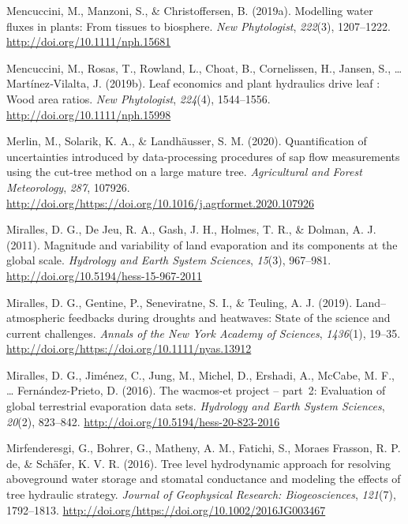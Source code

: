 \documentclass[11pt,twoside]{reedthesis}
\begin{document}
\hypertarget{ref-mencuccinimodelling2019}{}
Mencuccini, M., Manzoni, S., \& Christoffersen, B. (2019a). Modelling
water fluxes in plants: From tissues to biosphere. \emph{New
Phytologist}, \emph{222}(3), 1207--1222.
\url{http://doi.org/10.1111/nph.15681}

\hypertarget{ref-mencuccini_leaf_2019}{}
Mencuccini, M., Rosas, T., Rowland, L., Choat, B., Cornelissen, H.,
Jansen, S., \ldots{} Martínez‐Vilalta, J. (2019b). Leaf economics and
plant hydraulics drive leaf : Wood area ratios. \emph{New Phytologist},
\emph{224}(4), 1544--1556. \url{http://doi.org/10.1111/nph.15998}

\hypertarget{ref-Merlin2020}{}
Merlin, M., Solarik, K. A., \& Landhäusser, S. M. (2020). Quantification
of uncertainties introduced by data-processing procedures of sap flow
measurements using the cut-tree method on a large mature tree.
\emph{Agricultural and Forest Meteorology}, \emph{287}, 107926.
\url{http://doi.org/https://doi.org/10.1016/j.agrformet.2020.107926}

\hypertarget{ref-Miralles2011}{}
Miralles, D. G., De Jeu, R. A., Gash, J. H., Holmes, T. R., \& Dolman,
A. J. (2011). Magnitude and variability of land evaporation and its
components at the global scale. \emph{Hydrology and Earth System
Sciences}, \emph{15}(3), 967--981.
\url{http://doi.org/10.5194/hess-15-967-2011}

\hypertarget{ref-Miralles2019}{}
Miralles, D. G., Gentine, P., Seneviratne, S. I., \& Teuling, A. J.
(2019). Land--atmospheric feedbacks during droughts and heatwaves: State
of the science and current challenges. \emph{Annals of the New York
Academy of Sciences}, \emph{1436}(1), 19--35.
\url{http://doi.org/https://doi.org/10.1111/nyas.13912}

\hypertarget{ref-Miralles2016}{}
Miralles, D. G., Jiménez, C., Jung, M., Michel, D., Ershadi, A., McCabe,
M. F., \ldots{} Fernández-Prieto, D. (2016). The wacmos-et project --
part~2: Evaluation of global terrestrial evaporation data sets.
\emph{Hydrology and Earth System Sciences}, \emph{20}(2), 823--842.
\url{http://doi.org/10.5194/hess-20-823-2016}

\hypertarget{ref-Mirfenderesgi2016}{}
Mirfenderesgi, G., Bohrer, G., Matheny, A. M., Fatichi, S., Moraes
Frasson, R. P. de, \& Schäfer, K. V. R. (2016). Tree level hydrodynamic
approach for resolving aboveground water storage and stomatal
conductance and modeling the effects of tree hydraulic strategy.
\emph{Journal of Geophysical Research: Biogeosciences}, \emph{121}(7),
1792--1813. \url{http://doi.org/https://doi.org/10.1002/2016JG003467}
\end{document}
